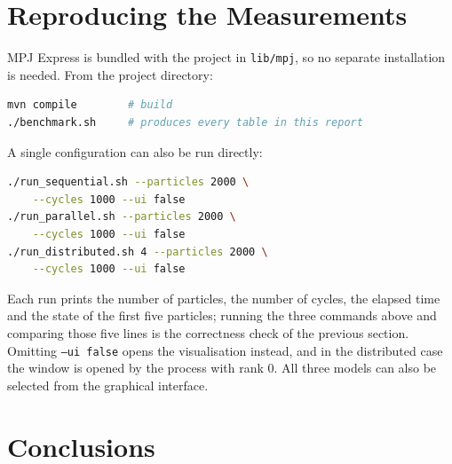 \documentclass[sigconf]{acmart}
\begin{document}
\section{Reproducing the Measurements}

MPJ Express is bundled with the project in \texttt{lib/mpj}, so no separate installation is needed.
From the project directory:

\begin{lstlisting}[language=bash]
mvn compile        # build
./benchmark.sh     # produces every table in this report
\end{lstlisting}

A single configuration can also be run directly:

\begin{lstlisting}[language=bash]
./run_sequential.sh --particles 2000 \
    --cycles 1000 --ui false
./run_parallel.sh --particles 2000 \
    --cycles 1000 --ui false
./run_distributed.sh 4 --particles 2000 \
    --cycles 1000 --ui false
\end{lstlisting}

Each run prints the number of particles, the number of cycles, the elapsed time and the state of the
first five particles; running the three commands above and comparing those five lines is the
correctness check of the previous section. Omitting \texttt{--ui false} opens the visualisation
instead, and in the distributed case the window is opened by the process with rank 0. All three
models can also be selected from the graphical interface.

\section{Conclusions}
\end{document}
